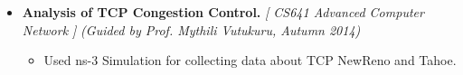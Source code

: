 \begin{itemize}
	\item \textbf{Analysis of TCP Congestion Control.} \hfill \emph{[ CS641 Advanced Computer Network ]} \emph{(Guided by Prof. Mythili Vutukuru, Autumn 2014)} \\[-0.6cm]
	\begin{itemize}
		\item Used ns-3 Simulation for collecting data about TCP NewReno and Tahoe. 
	\end{itemize}
		
\end{itemize}
